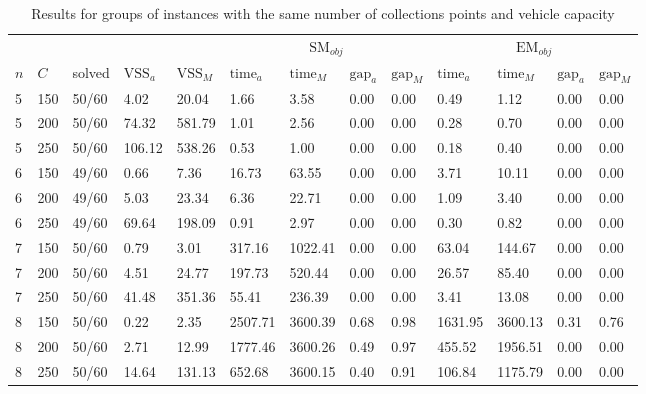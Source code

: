 \documentclass[preprint,11pt,authoryear]{elsarticle}
\begin{document}
\begin{table}[H]
\centering
\begin{tabular}{p{0.08cm}p{0.38cm}p{0.88cm}|p{0.9cm}p{0.95cm}|p{1.05cm}p{1.05cm}p{0.6cm}p{0.7cm}|p{1.05cm}p{1.05cm}p{0.6cm}p{0.7cm}}
\hline
\multicolumn{3}{c|}{} & \multicolumn{2}{c|}{} & \multicolumn{4}{c|}{$\text{SM}_{obj}$} & \multicolumn{4}{c}{$\text{EM}_{obj}$} \\
$n$ & $C$   & solved & $\text{VSS}_a$ & $\text{VSS}_M$ & $\text{time}_a$ & $\text{time}_M$ & $\text{gap}_a$ & $\text{gap}_M$ & $\text{time}_a$ & $\text{time}_M$ & $\text{gap}_a$ & $\text{gap}_M$ \\
\hline
5 & 150 & 50/60  & 4.02   & 20.04  & 1.66    & 3.58    & 0.00  & 0.00 & 0.49  & 1.12  & 0.00   & 0.00 \\
5 & 200 & 50/60  & 74.32  & 581.79 & 1.01    & 2.56    & 0.00  & 0.00 & 0.28 & 0.70 & 0.00  & 0.00 \\
5 & 250 & 50/60  & 106.12 & 538.26 & 0.53    & 1.00    & 0.00  & 0.00  & 0.18  & 0.40  & 0.00  & 0.00  \\
6 & 150 & 49/60  & 0.66   & 7.36   & 16.73   & 63.55   & 0.00  & 0.00 & 3.71  & 10.11  & 0.00     & 0.00 \\
6 & 200 & 49/60  & 5.03   & 23.34  & 6.36    & 22.71   & 0.00  & 0.00 & 1.09   & 3.40   & 0.00  & 0.00 \\
6 & 250 & 49/60  & 69.64  & 198.09 & 0.91    & 2.97    & 0.00  & 0.00 &  0.30  & 0.82  & 0.00     & 0.00  \\
7 & 150 & 50/60  & 0.79   & 3.01   & 317.16  & 1022.41 & 0.00  & 0.00  & 63.04  & 144.67  & 0.00  & 0.00  \\
7 & 200 & 50/60  & 4.51   & 24.77  & 197.73  & 520.44  & 0.00  & 0.00  & 26.57  & 85.40  & 0.00   & 0.00 \\
7 & 250 & 50/60  & 41.48  & 351.36 & 55.41   & 236.39  & 0.00  & 0.00  & 3.41  & 13.08  & 0.00  & 0.00 \\
8 & 150 & 50/60  & 0.22   & 2.35   & 2507.71 & 3600.39 & 0.68  & 0.98  & 1631.95  & 3600.13  & 0.31   & 0.76  \\
8 & 200 & 50/60  & 2.71   & 12.99  & 1777.46 & 3600.26 & 0.49  & 0.97  &  455.52  & 1956.51    & 0.00  & 0.00  \\
8 & 250 & 50/60  & 14.64  & 131.13 & 652.68  & 3600.15 & 0.40  & 0.91 & 106.84  & 1175.79    & 0.00  & 0.00  \\
\hline
\end{tabular}
\caption{Results for groups of instances with the same number of collections points and vehicle capacity}\label{tab:all_results}
\end{table}
\end{document}
